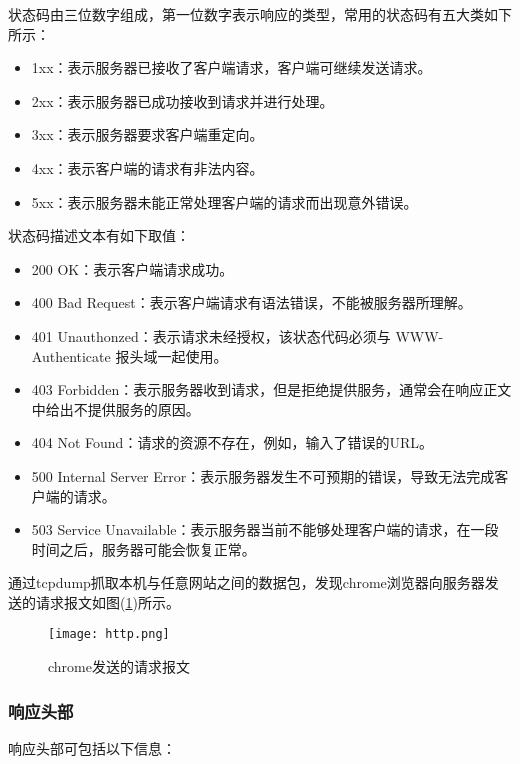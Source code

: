 \documentclass[bachelor]{thesis-uestc}
\begin{document}
状态码由三位数字组成，第一位数字表示响应的类型，常用的状态码有五大类如下所示：
\begin{itemize}
	\item 1xx：表示服务器已接收了客户端请求，客户端可继续发送请求。
	\item 2xx：表示服务器已成功接收到请求并进行处理。
	\item 3xx：表示服务器要求客户端重定向。
	\item 4xx：表示客户端的请求有非法内容。
	\item 5xx：表示服务器未能正常处理客户端的请求而出现意外错误。
\end{itemize}

状态码描述文本有如下取值：

\begin{itemize}
	\item 200 OK：表示客户端请求成功。
	\item 400 Bad Request：表示客户端请求有语法错误，不能被服务器所理解。
	\item 401 Unauthonzed：表示请求未经授权，该状态代码必须与 WWW-Authenticate 报头域一起使用。
	\item 403 Forbidden：表示服务器收到请求，但是拒绝提供服务，通常会在响应正文中给出不提供服务的原因。
	\item 404 Not Found：请求的资源不存在，例如，输入了错误的URL。
	\item 500 Internal Server Error：表示服务器发生不可预期的错误，导致无法完成客户端的请求。
	\item 503 Service Unavailable：表示服务器当前不能够处理客户端的请求，在一段时间之后，服务器可能会恢复正常。
\end{itemize}

通过tcpdump抓取本机与任意网站之间的数据包，发现chrome浏览器向服务器发送的请求报文如图(\ref{http})所示。
\begin{figure}[h]
\texttt{[image: http.png]}	
\caption{chrome发送的请求报文}
\label{http} 
\end{figure}
\subsubsection*{响应头部}

响应头部可包括以下信息：
\end{document}
